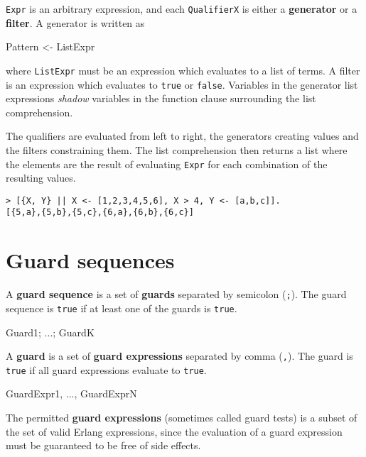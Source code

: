 \texttt{Expr} is an arbitrary expression, and each \texttt{QualifierX}
is either a \textbf{generator} or a \textbf{filter}. A generator is
written as

\begin{erlang}
Pattern <- ListExpr
\end{erlang}

where \texttt{ListExpr} must be an expression which evaluates to a
list of terms. A filter is an expression which evaluates to
\texttt{true} or \texttt{false}. Variables in the generator list
expressions \textit{shadow} variables in the function clause
surrounding the list comprehension.

The qualifiers are evaluated from left to right, the generators
creating values and the filters constraining them. The list
comprehension then returns a list where the elements are the result of
evaluating \texttt{Expr} for each combination of the resulting values.

\begin{verbatim}
> [{X, Y} || X <- [1,2,3,4,5,6], X > 4, Y <- [a,b,c]].
[{5,a},{5,b},{5,c},{6,a},{6,b},{6,c}]
\end{verbatim}


\section{Guard sequences}
A \textbf{guard sequence} is a set of \textbf{guards} separated by
semicolon (\texttt{;}). The guard sequence is \texttt{true} if at
least one of the guards is \texttt{true}.

\begin{erlang}
Guard1; ...; GuardK
\end{erlang}

A \textbf{guard} is a set of \textbf{guard expressions} separated by
comma (\texttt{,}). The guard is \texttt{true} if all guard
expressions evaluate to \texttt{true}.

\begin{erlang}
GuardExpr1, ..., GuardExprN
\end{erlang}

The permitted \textbf{guard expressions} (sometimes called guard
tests) is a subset of the set of valid Erlang expressions, since the
evaluation of a guard expression must be guaranteed to be free of side
effects.

